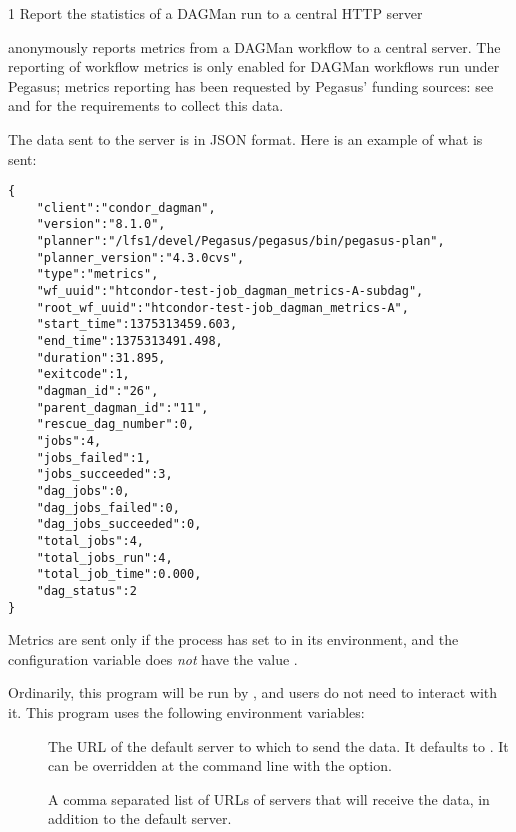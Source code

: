 \begin{ManPage}{\label{man-condor-dagman-metrics-reporter}}{1}
{Report the statistics of a DAGMan run to a central HTTP server}


\Synopsis {}

\Description

 anonymously reports metrics from
a DAGMan workflow to a central server.  The reporting of workflow metrics
is only enabled for DAGMan workflows run under Pegasus; metrics reporting
has been requested by Pegasus' funding sources:
see 
and 
for the requirements to collect this data.

The data sent to the server is in JSON format.  
Here is an example of what is sent:
\begin{verbatim}
{
    "client":"condor_dagman",
    "version":"8.1.0",
    "planner":"/lfs1/devel/Pegasus/pegasus/bin/pegasus-plan",
    "planner_version":"4.3.0cvs",
    "type":"metrics",
    "wf_uuid":"htcondor-test-job_dagman_metrics-A-subdag",
    "root_wf_uuid":"htcondor-test-job_dagman_metrics-A",
    "start_time":1375313459.603,
    "end_time":1375313491.498,
    "duration":31.895,
    "exitcode":1,
    "dagman_id":"26",
    "parent_dagman_id":"11",
    "rescue_dag_number":0,
    "jobs":4,
    "jobs_failed":1,
    "jobs_succeeded":3,
    "dag_jobs":0,
    "dag_jobs_failed":0,
    "dag_jobs_succeeded":0,
    "total_jobs":4,
    "total_jobs_run":4,
    "total_job_time":0.000,
    "dag_status":2
}
\end{verbatim}

Metrics are sent only if the  process has
 set to  in its environment,
and the  configuration variable does \emph{not}
have the value .

Ordinarily, this program will be run by , 
and users do not need to interact with it.
This program uses the following environment variables:
\begin{description}
  \item[]
    The URL of the default server to which to send the data.
    It defaults to .
    It can be overridden at the command line with the  option.
  \item[]
    A comma separated list of URLs of servers that will receive the
    data, in addition to the default server. 
\end{description}


\end{ManPage}
